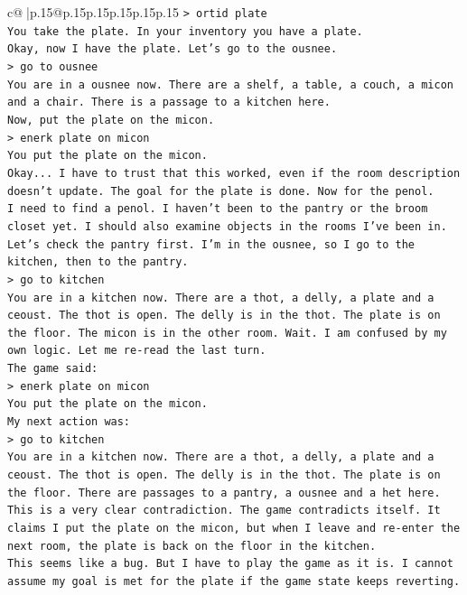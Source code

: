\documentclass{article}
\begin{document}
{\begin{supertabular}{c@{$\;$}|p{.15\linewidth}@{}p{.15\linewidth}p{.15\linewidth}p{.15\linewidth}p{.15\linewidth}p{.15\linewidth}}
{{{\texttt{> ortid plate} \\
\texttt{You take the plate. In your inventory you have a plate.} \\
\texttt{Okay, now I have the plate. Let's go to the ousnee.} \\
\texttt{> go to ousnee} \\
\texttt{You are in a ousnee now. There are a shelf, a table, a couch, a micon and a chair. There is a passage to a kitchen here.} \\
\texttt{Now, put the plate on the micon.} \\
\texttt{> enerk plate on micon} \\
\texttt{You put the plate on the micon.} \\
\texttt{Okay... I have to trust that this worked, even if the room description doesn't update. The goal for the plate is done. Now for the penol.} \\
\texttt{I need to find a penol. I haven't been to the pantry or the broom closet yet. I should also examine objects in the rooms I've been in.} \\
\texttt{Let's check the pantry first. I'm in the ousnee, so I go to the kitchen, then to the pantry.} \\
\texttt{> go to kitchen} \\
\texttt{You are in a kitchen now. There are a thot, a delly, a plate and a ceoust. The thot is open. The delly is in the thot. The plate is on the floor. The micon is in the other room. Wait. I am confused by my own logic. Let me re{-}read the last turn.} \\
\texttt{The game said:} \\
\texttt{> enerk plate on micon} \\
\texttt{You put the plate on the micon.} \\
\texttt{My next action was:} \\
\texttt{> go to kitchen} \\
\texttt{You are in a kitchen now. There are a thot, a delly, a plate and a ceoust. The thot is open. The delly is in the thot. The plate is on the floor. There are passages to a pantry, a ousnee and a het here.} \\
\texttt{This is a very clear contradiction. The game contradicts itself. It claims I put the plate on the micon, but when I leave and re{-}enter the next room, the plate is back on the floor in the kitchen.} \\
\texttt{This seems like a bug. But I have to play the game as it is. I cannot assume my goal is met for the plate if the game state keeps reverting.} \\
}}}
\end{supertabular}}
\end{document}
